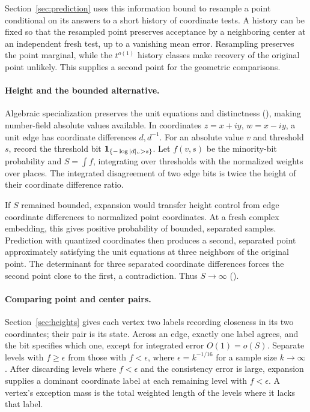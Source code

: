 Section~\ref{sec:prediction} uses this information bound to resample
a point conditional on its answers to a short history of coordinate
tests. A history can be fixed so that the resampled point preserves
acceptance by a neighboring center at an independent fresh test, up to
a vanishing mean error. Resampling preserves the point marginal,
while the \(t^{o(1)}\) history classes make recovery of the original
point unlikely. This supplies a second point for the geometric comparisons.

\paragraph{Height and the bounded alternative.}
Algebraic specialization preserves the unit equations and distinctness
(), making number-field absolute values
available. In coordinates \(z=x+iy\), \(w=x-iy\), a unit edge has
coordinate differences \(d,d^{-1}\). For an absolute value \(v\) and threshold \(s\), record the threshold bit
\(\mathbf 1_{\{-\log|d|_v>s\}}\). Let \(f(v,s)\) be the minority-bit
probability and \(S=\int f\), integrating over thresholds with the
normalized weights over places. The integrated disagreement of two
edge bits is twice the height of their coordinate difference ratio.

If \(S\) remained bounded, expansion would transfer height control
from edge coordinate differences to normalized point coordinates. At a fresh complex
embedding, this gives positive probability of bounded, separated
samples. Prediction with quantized coordinates then produces a second,
separated point approximately satisfying the unit equations at three
neighbors of the original point. The determinant for three separated
coordinate differences forces the second point close to the first, a contradiction.
Thus \(S\to\infty\) ().

\paragraph{Comparing point and center pairs.}
Section~\ref{sec:heights} gives each vertex two labels recording
closeness in its two coordinates; their pair is its state. Across an
edge, exactly one label agrees, and the bit specifies which one, except
for integrated error \(O(1)=o(S)\). Separate levels with $f\ge\epsilon$ from those with $f<\epsilon$, where $\epsilon=k^{-1/16}$ for a sample size $k\to\infty$. After discarding levels where $f<\epsilon$ and the consistency error is large, expansion supplies a dominant
coordinate label at each remaining level with $f<\epsilon$. A vertex's exception
mass is the total weighted length of the levels where it lacks that
label.


